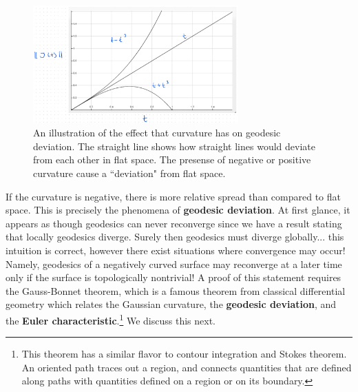 \begin{figure}[!htb]
	\centering
	\includegraphics[width=0.7\textwidth]{img/deviation.png}
	\caption{An illustration of the effect that curvature has on geodesic deviation. The straight line shows how straight lines would deviate from each other in flat space. The presense of negative or positive curvature cause a ``deviation" from flat space.}
	\label{}
\end{figure}


If the curvature is negative, there is more relative spread than compared to flat space.
This is precisely the phenomena of \textbf{geodesic deviation}.
At first glance, it appears as though geodesics can never reconverge since we have a result stating that locally geodesics diverge.
Surely then geodesics must diverge globally... this intuition is correct, however there exist situations where convergence may occur!
Namely, geodesics of a negatively curved surface may reconverge at a later time only if the surface is topologically nontrivial!
A proof of this statement requires the Gauss-Bonnet theorem, which is a famous theorem from classical differential geometry which relates the Gaussian curvature, the \textbf{geodesic deviation}, and the \textbf{Euler characteristic}.\footnote{This theorem has a similar flavor to contour integration and Stokes theorem. An oriented path traces out a region, and connects quantities that are defined along paths with quantities defined on a region or on its boundary.} We discuss this next.
